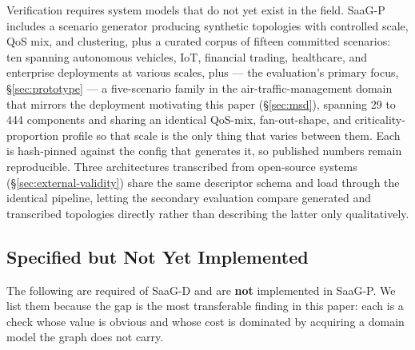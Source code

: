 \documentclass[sigconf,9pt]{acmart}
\begin{document}
Verification requires system models that do not yet exist in the field. SaaG-P includes a scenario
generator producing synthetic topologies with controlled scale, QoS mix, and clustering, plus a
curated corpus of fifteen committed scenarios: ten spanning autonomous vehicles, IoT, financial
trading, healthcare, and enterprise deployments at various scales, plus --- the evaluation's primary
focus, \S\ref{sec:prototype} --- a five-scenario family in the air-traffic-management domain that
mirrors the deployment motivating this paper (\S\ref{sec:msd}), spanning 29 to 444 components and
sharing an identical QoS-mix, fan-out-shape, and criticality-proportion profile so that scale is
the only thing that varies between them. Each is hash-pinned against the config that generates it,
so published numbers remain reproducible. Three architectures transcribed from open-source systems
(\S\ref{sec:external-validity}) share the same descriptor schema and load through the identical
pipeline, letting the secondary evaluation compare generated and transcribed topologies directly
rather than describing the latter only qualitatively.

\subsection{Specified but Not Yet Implemented}
\label{sec:gap-table}

The following are required of SaaG-D and are \textbf{not} implemented in SaaG-P. We list them
because the gap is the most transferable finding in this paper: each is a check whose value is
obvious and whose cost is dominated by acquiring a domain model the graph does not carry.
\end{document}

